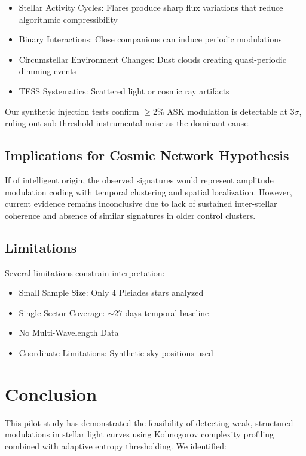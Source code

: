 \documentclass[twocolumn,10pt]{article}
\begin{document}
\begin{itemize}
    \item Stellar Activity Cycles: Flares produce sharp flux variations that reduce algorithmic compressibility
    \item Binary Interactions: Close companions can induce periodic modulations
    \item Circumstellar Environment Changes: Dust clouds creating quasi-periodic dimming events
    \item TESS Systematics: Scattered light or cosmic ray artifacts
\end{itemize}

Our synthetic injection tests confirm $\geq 2\%$ ASK modulation is detectable at $3\sigma$, ruling out sub-threshold instrumental noise as the dominant cause.

\subsection{Implications for Cosmic Network Hypothesis}

If of intelligent origin, the observed signatures would represent amplitude modulation coding with temporal clustering and spatial localization. However, current evidence remains inconclusive due to lack of sustained inter-stellar coherence and absence of similar signatures in older control clusters.

\subsection{Limitations}

Several limitations constrain interpretation:
\begin{itemize}
    \item Small Sample Size: Only 4 Pleiades stars analyzed
    \item Single Sector Coverage: $\sim 27$ days temporal baseline
    \item No Multi-Wavelength Data
    \item Coordinate Limitations: Synthetic sky positions used
\end{itemize}

\section{Conclusion}

This pilot study has demonstrated the feasibility of detecting weak, structured modulations in stellar light curves using Kolmogorov complexity profiling combined with adaptive entropy thresholding. We identified:
\end{document}
